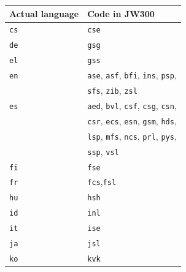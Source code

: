 \begin{table}[th!]
    \centering
    \small
    \begin{tabular}{ll}
        \toprule
        \textbf{ Actual language} & \textbf{Code in JW300}                                                \\
        \midrule
        \texttt{cs}               & \texttt{cse}                                                          \\
        \texttt{de}               & \texttt{gsg}                                                          \\
        \texttt{el}               & \texttt{gss}                                                          \\
        \texttt{en}               & \texttt{ase}, \texttt{asf}, \texttt{bfi}, \texttt{ins}, \texttt{psp}, \\
                                  & \texttt{sfs}, \texttt{zib}, \texttt{zsl}                              \\
        \texttt{es}               & \texttt{aed}, \texttt{bvl}, \texttt{csf}, \texttt{csg}, \texttt{csn}, \\
                                  & \texttt{csr}, \texttt{ecs}, \texttt{esn}, \texttt{gsm}, \texttt{hds}, \\
                                  & \texttt{lsp}, \texttt{mfs}, \texttt{ncs}, \texttt{prl}, \texttt{pys}, \\
                                  & \texttt{ssp}, \texttt{vsl}                                            \\
        \texttt{fi}               & \texttt{fse}                                                          \\
        \texttt{fr}               & \texttt{fcs},\texttt{fsl}                                             \\
        \texttt{hu}               & \texttt{hsh}                                                          \\
        \texttt{id}               & \texttt{inl}                                                          \\
        \texttt{it}               & \texttt{ise}                                                          \\
        \texttt{ja}               & \texttt{jsl}                                                          \\
        \texttt{ko}               & \texttt{kvk}                                                          \\

\end{tabular}
\end{table}
